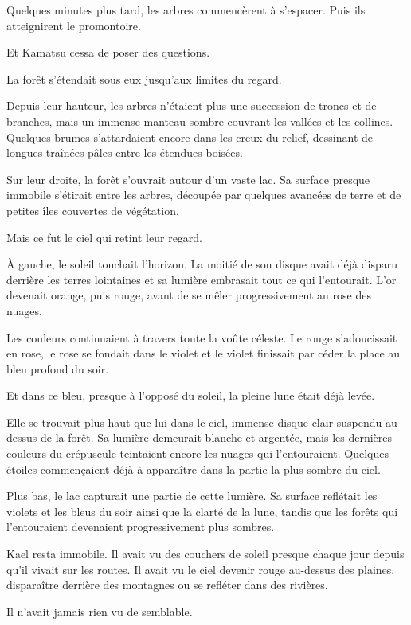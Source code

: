 Quelques minutes plus tard, les arbres commencèrent à s'espacer. Puis ils
atteignirent le promontoire.

Et Kamatsu cessa de poser des questions.

\scenebreak

La forêt s'étendait sous eux jusqu'aux limites du regard.

Depuis leur hauteur, les arbres n'étaient plus une succession de troncs et de
branches, mais un immense manteau sombre couvrant les vallées et les collines.
Quelques brumes s'attardaient encore dans les creux du relief, dessinant de
longues traînées pâles entre les étendues boisées.

Sur leur droite, la forêt s'ouvrait autour d'un vaste lac. Sa surface presque
immobile s'étirait entre les arbres, découpée par quelques avancées de terre et
de petites îles couvertes de végétation.

Mais ce fut le ciel qui retint leur regard.

À gauche, le soleil touchait l'horizon. La moitié de son disque avait déjà
disparu derrière les terres lointaines et sa lumière embrasait tout ce qui
l'entourait. L'or devenait orange, puis rouge, avant de se mêler progressivement
au rose des nuages.

Les couleurs continuaient à travers toute la voûte céleste. Le rouge
s'adoucissait en rose, le rose se fondait dans le violet et le violet finissait
par céder la place au bleu profond du soir.

Et dans ce bleu, presque à l'opposé du soleil, la pleine lune était déjà levée.

Elle se trouvait plus haut que lui dans le ciel, immense disque clair suspendu
au-dessus de la forêt. Sa lumière demeurait blanche et argentée, mais les
dernières couleurs du crépuscule teintaient encore les nuages qui
l'entouraient. Quelques étoiles commençaient déjà à apparaître dans la partie
la plus sombre du ciel.

Plus bas, le lac capturait une partie de cette lumière. Sa surface reflétait
les violets et les bleus du soir ainsi que la clarté de la lune, tandis que les
forêts qui l'entouraient devenaient progressivement plus sombres.

Kael resta immobile. Il avait vu des couchers de soleil presque chaque jour
depuis qu'il vivait sur les routes. Il avait vu le ciel devenir rouge au-dessus
des plaines, disparaître derrière des montagnes ou se refléter dans des
rivières.

Il n'avait jamais rien vu de semblable.


